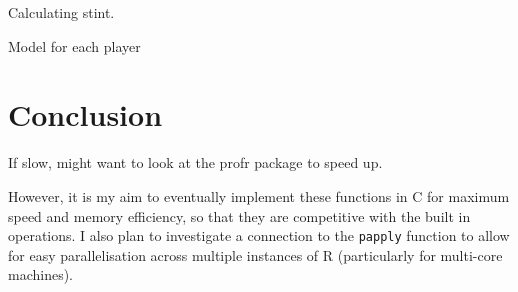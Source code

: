 \documentclass[letterpaper,oneside]{scrartcl}
\begin{document}
Calculating stint.  

Model for each player

\section{Conclusion}

If slow, might want to look at the profr package to speed up.  

However, it is my aim to eventually implement these functions in C for maximum speed and memory efficiency, so that they are competitive with the built in operations.  I also plan to investigate a connection to the {\tt papply} function to allow for easy parallelisation across multiple instances of R (particularly for multi-core machines).


\end{document}
